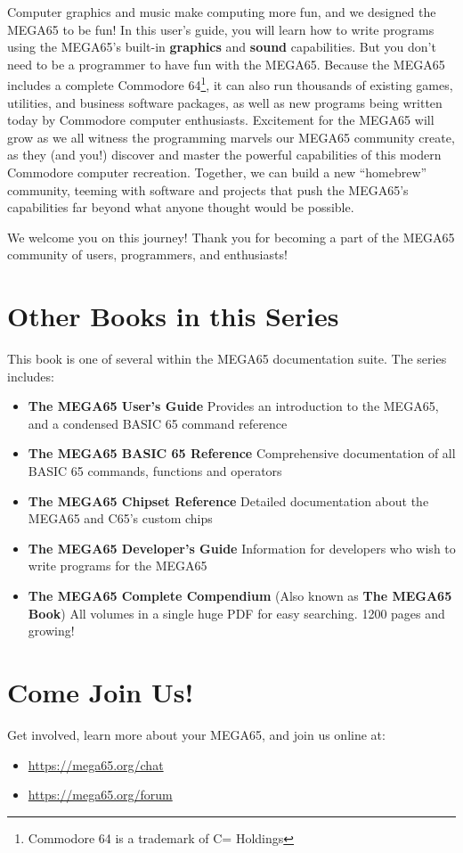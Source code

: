 Computer graphics and music make computing more fun, and we designed the MEGA65 to be fun! In this user's guide, you will learn how to write programs using the MEGA65's built-in {\bf graphics} and {\bf sound} capabilities. But you don't need to be a programmer to have fun with the MEGA65. Because the MEGA65 includes a complete Commodore{\textregistered} 64{\texttrademark}\footnote{Commodore 64 is a trademark of C= Holdings}, it can also run thousands of existing games, utilities, and business software packages, as well as new programs being written today by Commodore computer enthusiasts. Excitement for the MEGA65 will grow as we all witness the programming marvels our MEGA65 community create, as they (and you!) discover and master the powerful capabilities of this modern Commodore computer recreation. Together, we can build a new ``homebrew'' community, teeming with software and projects that push the MEGA65's capabilities far beyond what anyone thought would be possible.

We welcome you on this journey! Thank you for becoming a part of the MEGA65
community of users, programmers, and enthusiasts!

\section{Other Books in this Series}

This book is one of several within the MEGA65 documentation suite. The series includes:

\begin{itemize}
  \item {\bf The MEGA65 User's Guide} \newline
      Provides an introduction to the MEGA65, and a condensed BASIC 65 command reference
    \item {\bf The MEGA65 BASIC 65 Reference} \newline
      Comprehensive documentation of all BASIC 65 commands, functions and operators
    \item {\bf The MEGA65 Chipset Reference} \newline
      Detailed documentation about the MEGA65 and C65's custom chips
    \item {\bf The MEGA65 Developer's Guide} \newline
      Information for developers who wish to write programs for the MEGA65
    \item {\bf The MEGA65 Complete Compendium} \newline
      (Also known as {\bf The MEGA65 Book}) \newline
      All volumes in a single huge PDF for easy searching. 1200 pages and growing!
\end{itemize}

\section{Come Join Us!}
Get involved, learn more about your MEGA65, and join us online at:

\begin{itemize}
    \item \url{https://mega65.org/chat}
    \item \url{https://mega65.org/forum}
\end{itemize}
